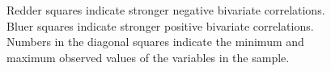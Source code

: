 \documentclass[a4paper]{article}\usepackage{graphicx, color}
\begin{document}
\begin{landscape}
\begin{figure}[t]
\begin{center}

    \end{center}
    \begin{singlespace}
        {\scriptsize{Redder squares indicate stronger negative bivariate correlations. \\
        Bluer squares indicate stronger positive bivariate correlations. \\
        Numbers in the diagonal squares indicate the minimum and maximum observed values of the variables in the sample.
        }}
    \end{singlespace} 
\end{figure}
\end{landscape}

\end{document}
